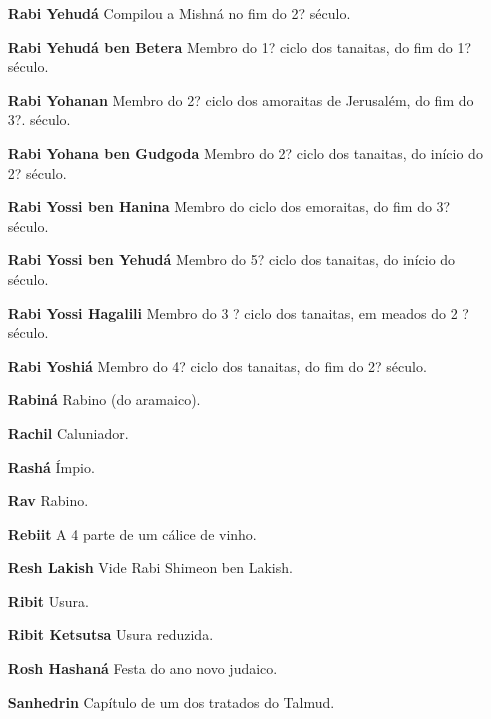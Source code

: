 \begin{itemize}
\item[\textbf{Rabi Yehudá}] Compilou a Mishná no fim do 2? século.

\item[\textbf{Rabi Yehudá ben Betera}] Membro do 1? ciclo dos tanaitas, do
fim do 1? século.

\item[\textbf{Rabi Yohanan}] Membro do 2? ciclo dos amoraitas de Jerusalém,
do fim do 3?. século.

\item[\textbf{Rabi Yohana ben Gudgoda}] Mem­bro do 2? ciclo dos tanaitas, do
início do 2? século.

\item[\textbf{Rabi Yossi ben Hanina}] Membro do
ciclo dos emoraitas, do fim do 3? século.

\item[\textbf{Rabi Yossi ben Yehudá}] Membro do 5? ciclo dos tanaitas, do início do século.

\item[\textbf{Rabi Yossi Hagalili}] Membro do 3 ? ci­clo dos tanaitas, em
meados do 2 ? século.

\item[\textbf{Rabi Yoshiá}] Membro do 4? ciclo dos tanaitas, do fim do 2? século.

\item[\textbf{Rabiná}] Rabino (do aramaico).

\item[\textbf{Rachil}] Caluniador.

\item[\textbf{Rashá}] Ímpio.

\item[\textbf{Rav}] Rabino.

\item[\textbf{Rebiit}] A 4 parte de um cálice de vinho.

\item[\textbf{Resh Lakish}] Vide Rabi Shimeon ben Lakish.

\item[\textbf{Ribit}] Usura.

\item[\textbf{Ribit Ketsutsa}] Usura reduzida.

\item[\textbf{Rosh Hashaná}] Festa do ano novo ju­daico.

\item[\textbf{Sanhedrin}] Capítulo de um dos tra­tados do Talmud.


\end{itemize}
